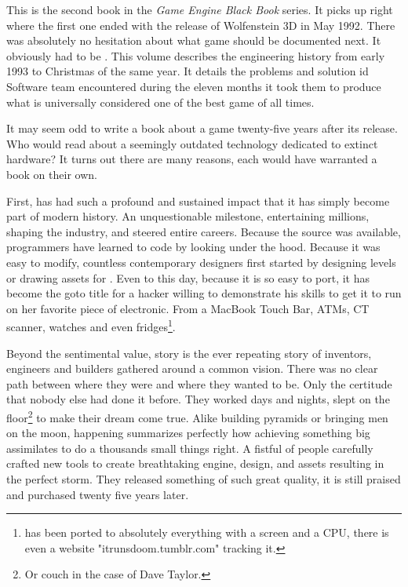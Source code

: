 This is the second book in the \textit{Game Engine Black Book} series. It picks up right where the first one ended with the release of Wolfenstein 3D in May 1992. There was absolutely no hesitation about what game should be documented next. It obviously had to be \doom. This volume describes the engineering history from early 1993 to Christmas of the same year. It details the problems and solution id Software team encountered during the eleven months it took them to produce what is universally considered one of the best game of all times.\\
\par
It may seem odd to write a book about a game twenty-five years after its release. Who would read about a seemingly outdated technology dedicated to extinct hardware? It turns out there are many reasons, each would have warranted a book on their own.\\ 
\par
First, \doom has had such a profound and sustained impact that it has simply become part of modern history. An unquestionable milestone, entertaining millions, shaping the industry, and steered entire careers. Because the source was available, programmers have learned to code by looking under the hood. Because it was easy to modify, countless contemporary designers first started by designing levels or drawing assets for \doom. Even to this day, because it is so easy to port, it has become the goto title for a hacker willing to demonstrate his skills to get it to run on her favorite piece of electronic. From a MacBook Touch Bar, ATMs, CT scanner, watches and even fridges\footnote{\doom has been ported to absolutely everything with a screen and a CPU, there is even a website "itrunsdoom.tumblr.com" tracking it.}.\\
\par
Beyond the sentimental value, \doom story is the ever repeating story of inventors, engineers and builders gathered around a common vision. There was no clear path between where they were and where they wanted to be. Only the certitude that nobody else had done it before. They worked days and nights, slept on the floor\footnote{Or couch in the case of Dave Taylor.} to make their dream come true. Alike building pyramids or bringing men on the moon, \doom happening summarizes perfectly how achieving something big assimilates to do a thousands small things right. A fistful of people carefully crafted new tools to create breathtaking engine, design, and assets resulting in the perfect storm. They released something of such great quality, it is still praised and purchased twenty five years later.\\

